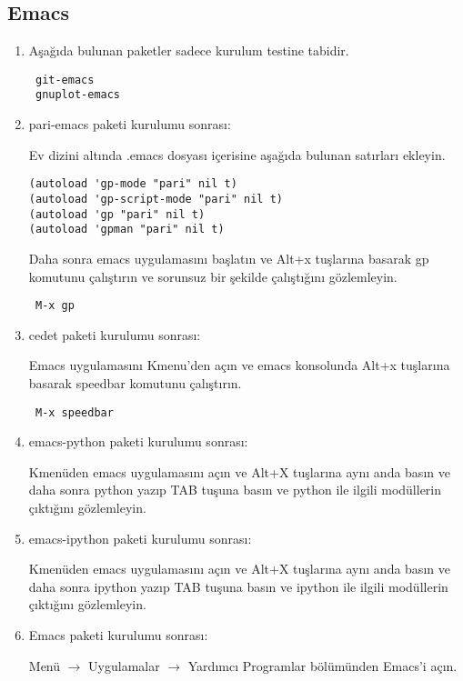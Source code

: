 \documentclass[a4paper,10pt]{article}
\begin{document}
\subsection*{Emacs}
\begin{enumerate}
\item Aşağıda bulunan paketler sadece kurulum testine tabidir.
\begin{verbatim}
 git-emacs
 gnuplot-emacs
\end{verbatim}

\item pari-emacs paketi kurulumu sonrası:

Ev dizini altında .emacs dosyası içerisine aşağıda bulunan satırları ekleyin. 
\begin{verbatim}
(autoload 'gp-mode "pari" nil t)
(autoload 'gp-script-mode "pari" nil t)
(autoload 'gp "pari" nil t)
(autoload 'gpman "pari" nil t)
\end{verbatim}

Daha sonra emacs uygulamasını başlatın ve Alt+x tuşlarına basarak gp komutunu çalıştırın ve sorunsuz bir şekilde çalıştığını gözlemleyin.
\begin{verbatim}
 M-x gp
\end{verbatim}

\item cedet paketi kurulumu sonrası:
 
Emacs uygulamasını Kmenu'den açın ve emacs konsolunda Alt+x tuşlarına basarak speedbar komutunu çalıştırın.
\begin{verbatim}
 M-x speedbar
\end{verbatim}

\item emacs-python paketi kurulumu sonrası:

Kmenüden emacs uygulamasını açın ve Alt+X tuşlarına aynı anda basın ve daha sonra python yazıp TAB tuşuna basın ve python ile ilgili modüllerin çıktığını gözlemleyin.

\item emacs-ipython paketi kurulumu sonrası:

Kmenüden emacs uygulamasını açın ve Alt+X tuşlarına aynı anda basın ve daha sonra ipython yazıp TAB tuşuna basın ve ipython ile ilgili modüllerin çıktığını gözlemleyin.

\item Emacs paketi kurulumu sonrası:

Menü $\rightarrow$ Uygulamalar $\rightarrow$ Yardımcı Programlar bölümünden Emacs'i açın.


\end{enumerate}
\end{document}
